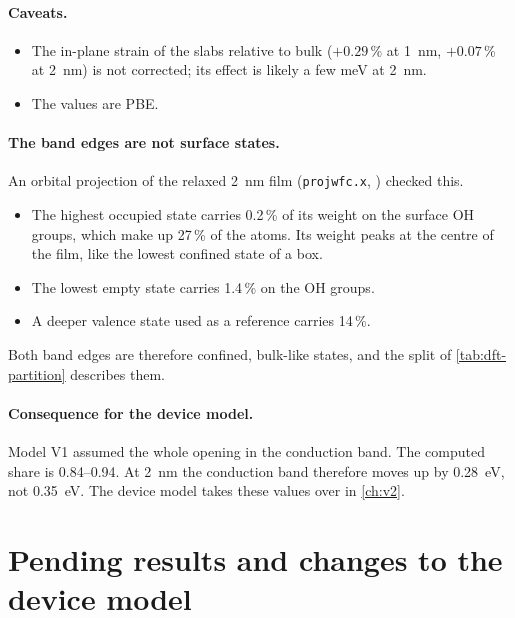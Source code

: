 \paragraph{Caveats.}
\begin{itemize}
\item The in-plane strain of the slabs relative to bulk ($+0.29$\,\% at 1~nm, $+0.07$\,\% at 2~nm) is not corrected;
its effect is likely a few meV at 2~nm.
\item The values are PBE.
\end{itemize}

\paragraph{The band edges are not surface states.} An orbital projection of the relaxed 2~nm film (\texttt{projwfc.x},
) checked this.
\begin{itemize}
\item The highest occupied state carries 0.2\,\% of its weight on the surface OH groups, which make up 27\,\% of the
atoms. Its weight peaks at the centre of the film, like the lowest confined state of a box.
\item The lowest empty state carries 1.4\,\% on the OH groups.
\item A deeper valence state used as a reference carries 14\,\%.
\end{itemize}
Both band edges are therefore confined, bulk-like states, and the split of \cref{tab:dft-partition} describes them.

\paragraph{Consequence for the device model.} Model V1 assumed the whole opening in the conduction band. The computed
share is 0.84--0.94. At 2~nm the conduction band therefore moves up by 0.28~eV, not 0.35~eV. The device model takes
these values over in \cref{ch:v2}.

\section{Pending results and changes to the device model}
\label{sec:dft-pending}

